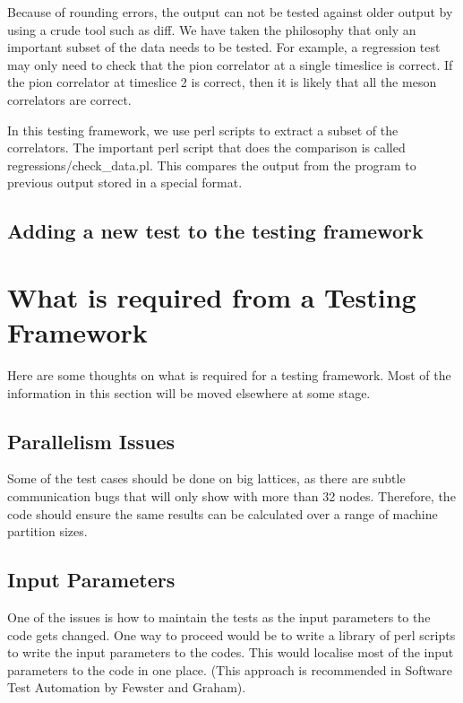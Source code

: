 \documentclass[12pt]{article}
\begin{document}
Because of rounding errors, the output can not be tested against older
output by using a crude tool such as diff. We have taken the
philosophy that only an important subset of the data needs to be
tested. For example, a regression test may only need to check that the
pion correlator at a single timeslice is correct. If the pion
correlator at timeslice 2 is correct, then it is likely that all the
meson correlators are correct.

In this testing framework, we use perl scripts to
extract a subset of the correlators. The important
perl script that does the comparison is called
regressions/check\_data.pl. This compares the output from
the program to previous output stored in a special format.

\subsection{Adding a new test to the testing framework}

\section{What is required from a  Testing Framework}

Here are some thoughts on what is required for a testing
framework. Most of the information in this section will
be moved elsewhere at some stage.

\subsection{Parallelism Issues}
Some of the test cases should be done on big lattices, as there are subtle communication bugs that will only show with more than 32 nodes.  Therefore, the code should ensure the same results can be calculated over a range of machine partition sizes.

\subsection{Input Parameters}
One of the issues is how to maintain the tests 
as the input parameters to the code gets changed. One way to
proceed would be to write a library of perl scripts to write 
the input parameters to the codes. This would localise most of the 
input parameters to the code in one place. (This approach is 
recommended in Software Test Automation by Fewster and 
Graham).
\end{document}
